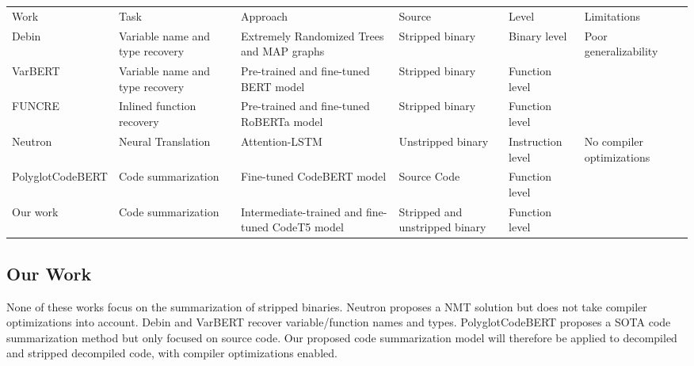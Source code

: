 \begin{table}[!h]
\begin{sideways}
\begin{tabulary}{1.5\textwidth}{lLLLLL}
Work     & Task                            & Approach                                           & Source                         & Level             & Limitations               \\
Debin    & Variable name and type recovery & Extremely Randomized Trees and MAP graphs           & Stripped binary                & Binary level      & Poor generalizability     \\
VarBERT  & Variable name and type recovery & Pre-trained and fine-tuned BERT model              & Stripped binary                & Function level    &                           \\
FUNCRE   & Inlined function recovery       & Pre-trained and fine-tuned RoBERTa model           & Stripped binary                & Function level    &                           \\
Neutron  & Neural Translation              & Attention-LSTM                                     & Unstripped binary              & Instruction level & No compiler optimizations \\ 
PolyglotCodeBERT & Code summarization       & Fine-tuned CodeBERT model   & Source Code & Function level    &   \\
Our work & Code summarization              & Intermediate-trained and fine-tuned CodeT5 model   & Stripped and unstripped binary & Function level    &   \\

\end{tabulary}
\end{sideways}
\end{table}

\subsection{Our Work}
None of these works focus on the summarization of stripped binaries. Neutron \cite{Neutron} proposes a NMT solution but does not take compiler optimizations into account. Debin \cite{Debin} and VarBERT recover variable/function names and types. PolyglotCodeBERT proposes a SOTA code summarization method but only focused on source code. Our proposed code summarization model will therefore be applied to decompiled and stripped decompiled code, with compiler optimizations enabled.
